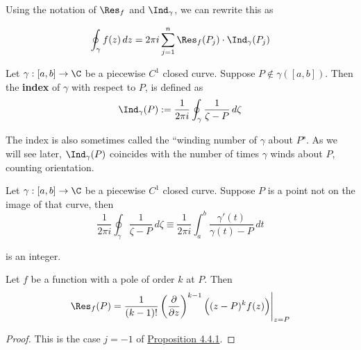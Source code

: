 Using the notation of \href{ea3ff58}{$\Res_f$} and
\href{bfdcc82}{$\Ind_\gamma$}, we can rewrite this as

$$
  \oint_\gamma f(z)\,dz=2\pi i\sum_{j=1}^n\Res_f(P_j)\cdot\Ind_\gamma(P_j)
$$

\label{bfdcc82}

Let $\gamma:[a,b]\to\C$ be a piecewise $C^1$ closed curve. Suppose
$P\notin\gamma([a,b])$. Then the \textbf{index} of $\gamma$ with respect to
$P$, is defined as
$$
  \Ind_\gamma(P):=\frac1{2\pi i}\oint_\gamma\frac1{\zeta-P}\,d\zeta
$$

The index is also sometimes called the ``winding number of $\gamma$ about $P$".
As we will see later, $\Ind_\gamma(P)$ coincides with the number of times
$\gamma$ winds about $P$, counting orientation.

\label{ff34baf}

Let $\gamma:[a,b]\to\C$ be a piecewise $C^1$ closed curve. Suppose $P$ is a
point not on the image of that curve, then
$$
  \frac1{2\pi i}\oint_\gamma\frac1{\zeta-P}\,d\zeta
  \equiv
  \frac1{2\pi i}\int_a^b\frac{\gamma'(t)}{\gamma(t)-P}\,dt
$$

is an integer.

\label{a264ecd}

Let $f$ be a function with a pole of order $k$ at $P$. Then
$$
  \Res_f(P)=\frac1{(k-1)!}\left(\frac\partial{\partial z}\right)^{k-1}
  \Big((z-P)^kf(z)\Big)\Bigg|_{z=P}
$$

\begin{proof}
  This is the case $j=-1$ of \href{c1d2d0c}{Proposition 4.4.1}.
\end{proof}
